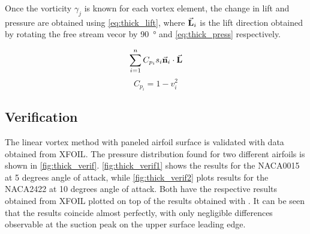 Once the vorticity $\gamma_j$ is known for each vortex element, the change in
lift and pressure are obtained using \autoref{eq:thick_lift}, where
$\vec{\bf{L}}_i$ is the lift direction obtained by rotating the free stream
vecor by \SI{90}{\degree} and
\autoref{eq:thick_press} respectively.

\begin{equation}
\label{eq:thick_lift}
\sum_{i=1}^{n} C_{p_i} s_i \vec{\bf{n}}_i \cdot \vec{\bf{L}}
\end{equation}
\medskip
\begin{equation}
\label{eq:thick_press}
C_{p_i} = 1 - v_i^2
\end{equation}
\medskip


\subsection{Verification}
The linear vortex method with paneled airfoil surface is validated with data
obtained from XFOIL\cite{xfoil}. The pressure distribution found for two
different airfoils is shown in \autoref{fig:thick_verif}.
\autoref{fig:thick_verif1}  shows the results for
the NACA0015 at 5 degrees angle of attack, while \autoref{fig:thick_verif2} plots results for
the NACA2422 at 10 degrees angle of attack. Both have the respective results
obtained from XFOIL plotted on top of the results obtained with \numfoil. It can be seen
that the results coincide almost perfectly, with only negligible differences
observable at the suction peak on the upper surface leading edge.

